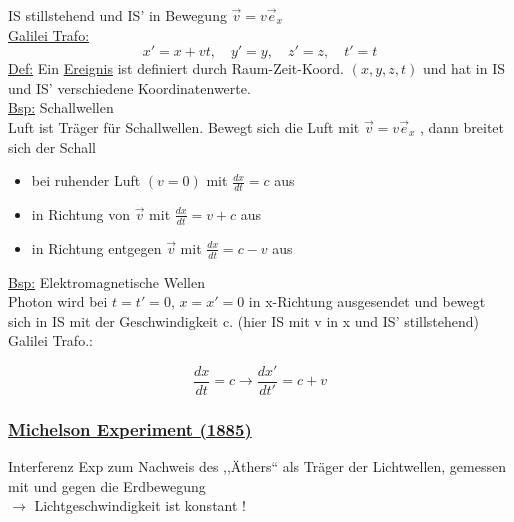 \documentclass[titlepage,12pt,a4paper,ngerman]{report}
\begin{document}
{

IS stillstehend und IS' in Bewegung $ \vec{v} = v \vec{e}_x $\\[10pt]
\underline{Galilei Trafo:}
\begin{equation*}
x' = x + vt , \quad y' = y , \quad z' = z, \quad t' = t \tag{1}
\end{equation*}
\underline{Def:} Ein \underline{Ereignis} ist definiert durch Raum-Zeit-Koord. $ (x,y,z,t) $ und hat in IS und IS' verschiedene Koordinatenwerte.\\[10pt]
\underline{Bsp:} Schallwellen\\
Luft ist Träger für Schallwellen. Bewegt sich die Luft mit $ \vec{v} = v \vec{e}_x $ , dann breitet sich der Schall
\begin{itemize}
	\item bei ruhender Luft $ (v=0) $ mit $ \frac{dx}{dt} = c $ aus
	\item in Richtung von $ \vec{v} $ mit $ \frac{dx}{dt} = v+c $ aus
	\item in Richtung entgegen $ \vec{v} $ mit $ \frac{dx}{dt} = c-v $ aus
\end{itemize}
\underline{Bsp:} Elektromagnetische Wellen\\
Photon wird bei $ t = t' = 0 $, $ x = x' = 0 $ in x-Richtung ausgesendet und bewegt sich in IS mit der Geschwindigkeit c. (hier IS mit v in x und IS' stillstehend)\\
Galilei Trafo.:
%

\begin{equation*}
\frac{dx}{dt} = c \longrightarrow \frac{dx'}{dt'} = c+v
\end{equation*}
\subsubsection{\underline{Michelson Experiment (1885)}}
Interferenz Exp zum Nachweis des ,,Äthers`` als Träger der Lichtwellen, gemessen mit und gegen die Erdbewegung\\
$ \rightarrow $ Lichtgeschwindigkeit ist konstant !

}
\end{document}
